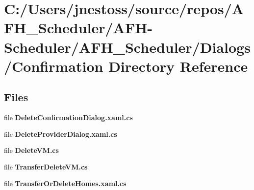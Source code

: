 \section{C\+:/\+Users/jnestoss/source/repos/\+A\+F\+H\+\_\+\+Scheduler/\+A\+F\+H-\/\+Scheduler/\+A\+F\+H\+\_\+\+Scheduler/\+Dialogs/\+Confirmation Directory Reference}
\label{dir_9805131e6539c488bbd793ffbd55af4c}
\subsection*{Files}
\begin{DoxyCompactItemize}
\item 
file \textbf{ Delete\+Confirmation\+Dialog.\+xaml.\+cs}
\item 
file \textbf{ Delete\+Provider\+Dialog.\+xaml.\+cs}
\item 
file \textbf{ Delete\+V\+M.\+cs}
\item 
file \textbf{ Transfer\+Delete\+V\+M.\+cs}
\item 
file \textbf{ Transfer\+Or\+Delete\+Homes.\+xaml.\+cs}
\end{DoxyCompactItemize}
